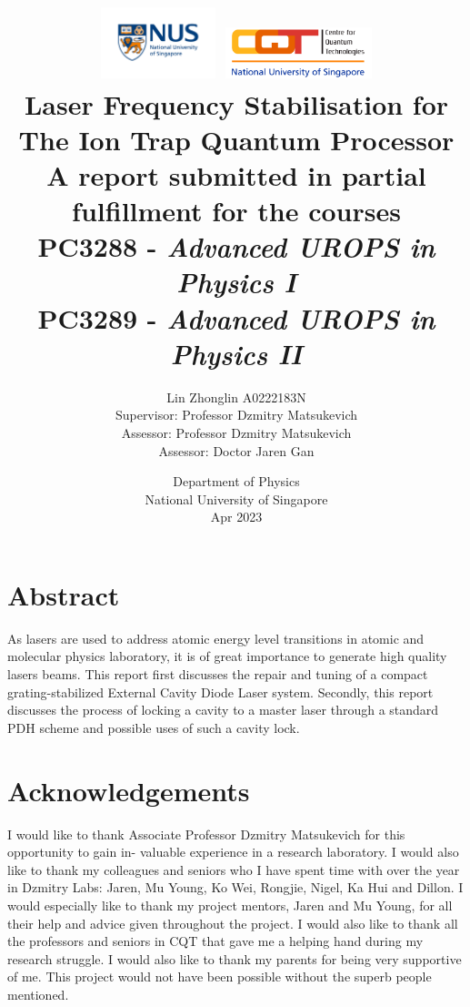 \documentclass[12pt]{report}
\title{
\includegraphics[width=0.25\textwidth]{nus_logo.jpeg}
\includegraphics[width=0.32\textwidth]{cqt_logo.png}\\
{\LARGE \textbf{Laser Frequency Stabilisation for The Ion Trap Quantum Processor}}\\
\vspace{5mm}
{\normalsize A report submitted in partial fulfillment for the courses}\\
{\normalsize PC3288 - \textit{Advanced UROPS in Physics I}}\\
{\normalsize PC3289 - \textit{Advanced UROPS in Physics II}}
}
\author{
{\normalsize Lin Zhonglin \hspace{10mm} A0222183N}\\
\vspace{1mm}
{\normalsize Supervisor: Professor Dzmitry Matsukevich}\\
{\normalsize Assessor: Professor Dzmitry Matsukevich}\\
{\normalsize Assessor: Doctor Jaren Gan }}\\
\date{{\normalsize Department of Physics}\\
{\normalsize National University of Singapore}\\
{\normalsize Apr 2023}}
\begin{document}
\maketitle

\chapter*{Abstract}
As lasers are used to address atomic energy level transitions in atomic and molecular physics laboratory, it is of great importance to generate high quality lasers beams. This report first discusses the repair and tuning of a compact grating-stabilized External Cavity Diode Laser system. Secondly, this report discusses the process of locking a cavity to a master laser through a standard PDH scheme and possible uses of such a cavity lock. 


\chapter*{Acknowledgements}
I would like to thank Associate Professor Dzmitry Matsukevich for this opportunity to gain in- valuable experience in a research laboratory.
I would also like to thank my colleagues and seniors who I have spent time with over the year in Dzmitry Labs: Jaren, Mu Young, Ko Wei, Rongjie, Nigel, Ka Hui and Dillon. I would especially like to thank my project mentors, Jaren and Mu Young, for all their help and advice given throughout the project. I would also like to thank all the professors and seniors in CQT that gave me a helping hand during my research struggle. 
I would also like to thank my parents for being very supportive of me.
This project would not have been possible without the superb people mentioned.

\tableofcontents
\end{document}
